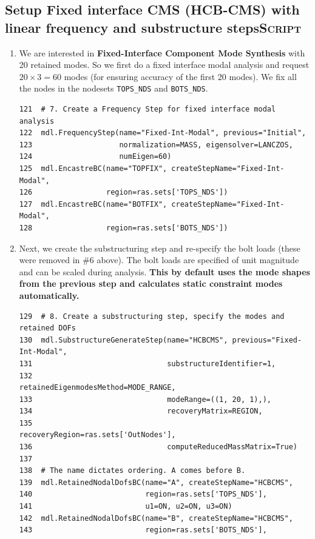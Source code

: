 \documentclass[11pt]{article}
\begin{document}
\subsection{Setup Fixed interface CMS (HCB-CMS) with linear frequency and substructure steps\hfill{}\textsc{Script}}
\label{sec:org9bf160f}
\begin{enumerate}
\item We are interested in \textbf{Fixed-Interface Component Mode Synthesis} with 20 retained modes.
So we first do a fixed interface modal analysis and request \(20\times3 = 60\) modes (for ensuring accuracy of the first 20 modes).
We fix all the nodes in the nodesets \texttt{TOPS\_NDS} and \texttt{BOTS\_NDS}.
\begin{verbatim}
121  # 7. Create a Frequency Step for fixed interface modal analysis
122  mdl.FrequencyStep(name="Fixed-Int-Modal", previous="Initial",
123                    normalization=MASS, eigensolver=LANCZOS,
124                    numEigen=60)
125  mdl.EncastreBC(name="TOPFIX", createStepName="Fixed-Int-Modal",
126                 region=ras.sets['TOPS_NDS'])
127  mdl.EncastreBC(name="BOTFIX", createStepName="Fixed-Int-Modal",
128                 region=ras.sets['BOTS_NDS'])
\end{verbatim}
\item Next, we create the substructuring step and re-specify the bolt loads (these were removed in \#6 above).
The bolt loads are specified of unit magnitude and can be scaled during analysis.
\textbf{This by default uses the mode shapes from the previous step and calculates static constraint modes automatically.}
\begin{verbatim}
129  # 8. Create a substructuring step, specify the modes and retained DOFs
130  mdl.SubstructureGenerateStep(name="HCBCMS", previous="Fixed-Int-Modal",
131                               substructureIdentifier=1, 
132                               retainedEigenmodesMethod=MODE_RANGE,
133                               modeRange=((1, 20, 1),),
134                               recoveryMatrix=REGION,
135                               recoveryRegion=ras.sets['OutNodes'],
136                               computeReducedMassMatrix=True)
137  
138  # The name dictates ordering. A comes before B.
139  mdl.RetainedNodalDofsBC(name="A", createStepName="HCBCMS", 
140                          region=ras.sets['TOPS_NDS'], 
141                          u1=ON, u2=ON, u3=ON)
142  mdl.RetainedNodalDofsBC(name="B", createStepName="HCBCMS", 
143                          region=ras.sets['BOTS_NDS'], 

\end{verbatim}
\end{enumerate}
\end{document}
